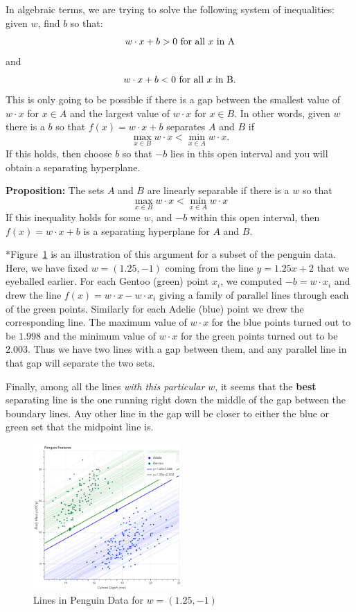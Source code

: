 \documentclass[
  11pt,
  letterpaper,
]{scrbook}
\theoremstyle{plain}
\theoremstyle{plain}
\theoremstyle{remark}
\begin{document}
In algebraic terms, we are trying to solve the following system of
inequalities: given \(w\), find \(b\) so that: \[
w\cdot x+b>0 \hbox{ for all $x$ in A}
\] and \[
w\cdot x+b<0\hbox{ for all $x$ in B}.
\] This is only going to be possible if there is a gap between the
smallest value of \(w\cdot x\) for \(x\in A\) and the largest value of
\(w\cdot x\) for \(x\in B\). In other words, given \(w\) there is a
\(b\) so that \(f(x)=w\cdot x+b\) separates \(A\) and \(B\) if \[
\max_{x\in B}w\cdot x < \min_{x\in A} w\cdot x.
\] If this holds, then choose \(b\) so that \(-b\) lies in this open
interval and you will obtain a separating hyperplane.

\textbf{Proposition:} The sets \(A\) and \(B\) are linearly separable if
there is a \(w\) so that \[
\max_{x\in B}w\cdot x < \min_{x\in A} w\cdot x
\] If this inequality holds for some \(w\), and \(-b\) within this open
interval, then \(f(x)=w\cdot x+b\) is a separating hyperplane for \(A\)
and \(B\).

*Figure~\ref{fig-penguinhwy2} is an illustration of this argument for a
subset of the penguin data. Here, we have fixed \(w=(1.25,-1)\) coming
from the line \(y=1.25x+2\) that we eyeballed earlier. For each Gentoo
(green) point \(x_{i}\), we computed \(-b=w\cdot x_{i}\) and drew the
line \(f(x) = w\cdot x - w\cdot x_{i}\) giving a family of parallel
lines through each of the green points. Similarly for each Adelie (blue)
point we drew the corresponding line. The maximum value of \(w\cdot x\)
for the blue points turned out to be \(1.998\) and the minimum value of
\(w\cdot x\) for the green points turned out to be \(2.003\). Thus we
have two lines with a gap between them, and any parallel line in that
gap will separate the two sets.

Finally, among all the lines \emph{with this particular \(w\)}, it seems
that the \textbf{best} separating line is the one running right down the
middle of the gap between the boundary lines. Any other line in the gap
will be closer to either the blue or green set that the midpoint line
is.

\begin{figure}

{\centering \includegraphics[width=0.5\textwidth,height=\textheight]{chapters/img/penguinhwy2.png}

}

\caption{\label{fig-penguinhwy2}Lines in Penguin Data for
\(w=(1.25,-1)\)}

\end{figure}
\end{document}
